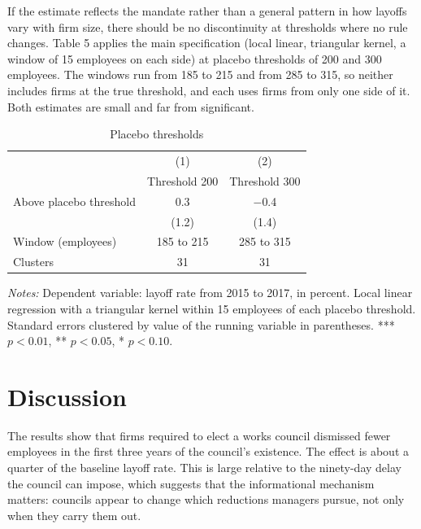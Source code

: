 \documentclass[12pt]{article}
\begin{document}
If the estimate reflects the mandate rather than a general pattern in how layoffs vary with firm size, there should be no discontinuity at thresholds where no rule changes. Table 5 applies the main specification (local linear, triangular kernel, a window of 15 employees on each side) at placebo thresholds of 200 and 300 employees. The windows run from 185 to 215 and from 285 to 315, so neither includes firms at the true threshold, and each uses firms from only one side of it. Both estimates are small and far from significant.

\begin{table}[htbp]
\centering
\begin{threeparttable}
\caption{Placebo thresholds}
\begin{tabular}{lcc}
\toprule
 & (1) & (2) \\
 & Threshold 200 & Threshold 300 \\
\midrule
Above placebo threshold & 0.3 & $-$0.4 \\
 & (1.2) & (1.4) \\
\midrule
Window (employees) & 185 to 215 & 285 to 315 \\
Clusters & 31 & 31 \\
\bottomrule
\end{tabular}
\begin{tablenotes}\footnotesize
\item \emph{Notes:} Dependent variable: layoff rate from 2015 to 2017, in percent. Local linear regression with a triangular kernel within 15 employees of each placebo threshold. Standard errors clustered by value of the running variable in parentheses. *** $p<0.01$, ** $p<0.05$, * $p<0.10$.
\end{tablenotes}
\end{threeparttable}
\end{table}

\section{Discussion}

The results show that firms required to elect a works council dismissed fewer employees in the first three years of the council's existence. The effect is about a quarter of the baseline layoff rate. This is large relative to the ninety-day delay the council can impose, which suggests that the informational mechanism matters: councils appear to change which reductions managers pursue, not only when they carry them out.
\end{document}
